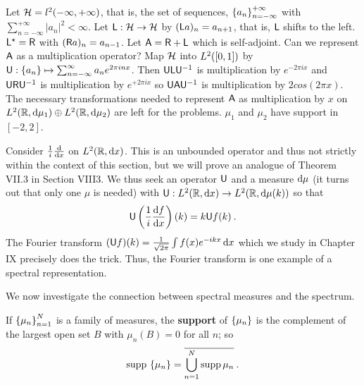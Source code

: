 \begin{example}
Let $\mathcal{H} = l^2(-\infty, +\infty)$, that is, the set of sequences, $\left \lbrace a_n \right \rbrace_{n=-\infty}^{+\infty}$ with $\sum_{n=-\infty}^{+\infty} |a_n|^2 < \infty$. Let $\mathsf{L} : \mathcal{H} \to \mathcal{H}$ by $(\mathsf{L} a)_n = a_{n+1}$, that is, $\mathsf{L}$ shifts to the left. $\mathsf{L}^\star = \mathsf{R}$ with $(\mathsf{R} a)_n = a_{n-1}$. Let $\mathsf{A} = \mathsf{R} + \mathsf{L}$ which is self-adjoint. Can we represent $\mathsf{A}$ as a multiplication operator? Map $\mathcal{H}$ into $L^{2}([0,1])$ by $\mathsf{U}: \left \lbrace a_n \right \rbrace \mapsto \sum_{n=-\infty}^\infty a_n e^{2 \pi i n x}$.
Then $\mathsf{U} \mathsf{L} \mathsf{U}^{-1}$ is multiplication by $e^{-2 \pi i x}$ and $\mathsf{U} \mathsf{R} \mathsf{U}^{-1}$ is multiplication by $e^{+2 \pi i x}$ so $\mathsf{U} \mathsf{A} \mathsf{U}^{-1}$ is multiplication by $2 cos( 2 \pi x)$. 
The necessary transformations needed to represent $\mathsf{A}$ as multiplication by $x$ on $L^{2}(\mathbb{R}, \mathrm{d} \mu_1) \oplus L^{2}(\mathbb{R}, \mathrm{d} \mu_2) $ are left for the problems. $\mu_1$ and $\mu_2$ have support in $[-2, 2]$.
\end{example}

\begin{example}
Consider $\frac{1}{i} \frac{\mathrm{d}}{\mathrm{d}x}$ on $L^{2}(\mathbb{R}, \mathrm{d} x)$. This is an unbounded operator and thus not strictly within the context of this section, but we will prove an analogue of Theorem VII.3 in Section VIII3. We thus seek an operator $\mathsf{U}$ and a measure $\mathrm{d} \mu$ (it turns out that only one $\mu$ is needed) with $\mathsf{U} : L^{2}(\mathbb{R}, \mathrm{d} x) \to L^{2}(\mathbb{R}, \mathrm{d} \mu(k))$ so that
\begin{align}
    \mathsf{U} \left( \frac{1}{i} \frac{\mathrm{d}f}{\mathrm{d}x} \right) (k) = k \mathsf{U} f(k) \:.
\end{align}
The Fourier transform $(\mathsf{U} f)(k) = \frac{1}{\sqrt{2 \pi}} \int f(x) e^{-ikx} \, \mathrm{d} x$ which we study in Chapter IX precisely does the trick. Thus, the Fourier transform is one example of a spectral representation.
\end{example}

We now investigate the connection between spectral measures and the
spectrum.

\begin{definition}
    If $\left \lbrace \mu_n \right \rbrace_{n=1}^N$ is a family of measures, the \textbf{support} of $\left \lbrace \mu_n \right \rbrace$ is the complement of the largest open set $B$ with $\mu_n (B) = 0$ for all $n$; so \begin{align}
        \mathrm{supp}\, \left \lbrace \mu_n \right \rbrace = \overline{ \bigcup_{n=1}^N \mathrm{supp}\, \mu_n } \:.
    \end{align}
\end{definition}

